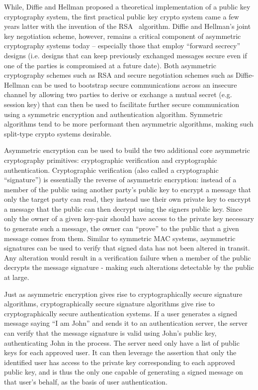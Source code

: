 While, Diffie and Hellman proposed a theoretical implementation of a
public key cryptography system, the first practical public key crypto
system came a few years latter with the invention of the
RSA~\cite{rivest1978} algorithm. Diffie and Hellman's joint key
negotiation scheme, however, remains a critical component of
asymmetric cryptography systems today -- especially those that employ
``forward secrecy'' designs (i.e. designs that can keep previously
exchanged messages secure even if one of the parties is compromised at
a future date). Both asymmetric cryptography schemes such as RSA and
secure negotiation schemes such as Diffie-Hellman can be used to
bootstrap secure communications across an insecure channel by allowing
two parties to derive or exchange a mutual secret (e.g. session key)
that can then be used to facilitate further secure communication using
a symmetric encryption and authentication algorithm. Symmetric
algorithms tend to be more performant then asymmetric algorithms,
making such split-type crypto systems desirable.

Asymmetric encryption can be used to build the two additional core
asymmetric cryptography primitives: cryptographic verification and
cryptographic authentication. Cryptographic verification (also called
a cryptographic ``signature'') is essentially the reverse of
asymmetric encryption: instead of a member of the public using another
party's public key to encrypt a message that only the target party can
read, they instead use their own private key to encrypt a message that
the public can then decrypt using the signers public key. Since only
the owner of a given key-pair should have access to the private key
necessary to generate such a message, the owner can ``prove'' to the
public that a given message comes from them. Similar to symmetric MAC
systems, asymmetric signatures can be used to verify that signed data
has not been altered in transit. Any alteration would result in a
verification failure when a member of the public decrypts the message
signature - making such alterations detectable by the public at large.

Just as asymmetric encryption gives rise to cryptographically secure
signature algorithms, cryptographically secure signature algorithms
give rise to cryptographically secure authentication systems. If a
user generates a signed message saying ``I am John'' and sends it to
an authentication server, the server can verify that the message
signature is valid using John's public key, authenticating John in the
process. The server need only have a list of public keys for each
approved user. It can then leverage the assertion that only the
identified user has access to the private key corresponding to each
approved public key, and is thus the only one capable of generating a
signed message on that user's behalf, as the basis of user
authentication.

